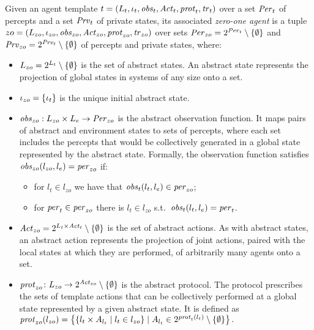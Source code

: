 \begin{definition}
Given an agent template ${t} = \left ( L_{t}, \iota_{t}, \mathit{obs}_{t},  \mathit{Act}_{t},
\mathit{prot}_{t}, \mathit{tr}_{t}  \right )$ over a set $\mathit{Per}_{t}$ of percepts and a set $\mathit{Prv}_{t}$ of
private states, its associated \emph{zero-one agent} is a tuple ${zo} =
\left ( L_{zo}, \iota_{zo}, \mathit{obs}_{zo}, \mathit{Act}_{zo}, \mathit{prot}_{zo}, \mathit{tr}_{zo} \right )$ over
sets $\mathit{Per}_{zo} = 2^{\mathit{Per}_{t}} \setminus \left \{ \emptyset \right \}$ and $\mathit{Prv}_{zo}=
2^{\mathit{Prv}_{t}} \setminus \left \{ \emptyset \right \}$ of percepts and private states, where:
\begin{itemize}[$\bullet$]\itemsep 0cm
    \item $L_{zo} = 2^{L_{t}} \setminus \left \{ \emptyset \right \}$ is the set
    of abstract states. An abstract state represents the projection of global
    states in systems of any size onto a set.

    \item $\iota_{zo} = \left \{ \iota_{t} \right \}$ is the unique initial abstract state.
    
    \item $\mathit{obs}_{zo} : L_{zo} \times L_{e} \rightarrow \mathit{Per}_{zo}$ is
    the abstract observation function. It maps pairs of abstract and environment
    states to sets of percepts, where each set includes the percepts that would
    be collectively generated in a global state represented by the abstract
    state. Formally, the observation function satisfies $\mathit{obs}_{zo}(l_{zo}, l_e) =
    \mathit{per}_{zo}$ if:
    \begin{itemize}[\textbf{--}]
    \item for $l_t \in l_{zo}$ we have that $\mathit{obs}_{t}(l_t, l_e) \in \mathit{per}_{zo}$;
      \item for $\mathit{per}_{t} \in \mathit{per}_{zo}$ there is $l_t \in l_{zo}$ s.t.\
        $\mathit{obs}_{t}(l_t, l_e) = \mathit{per}_{t}$.
    \end{itemize}

    \item $\mathit{Act}_{zo} = 2^{L_{t} \times \mathit{Act}_{t}} \setminus \left \{ \emptyset \right \}$
    is the set of abstract actions. As with abstract states, an abstract
    action represents the projection of joint actions, paired with the local
    states at which they are performed, of arbitrarily many agents onto a set.

    \item $\mathit{prot}_{zo} \colon L_{zo} \rightarrow 2^{\mathit{Act}_{zo}} \setminus
    \left \{ \emptyset \right \}$ is the abstract protocol. The protocol prescribes the sets
    of template actions that can be collectively performed at a global state
    represented by a given abstract state. It is defined as $\mathit{prot}_{zo}(l_{zo})
    = \left \{  \left \{ l_t \times A_{l_t} \mid l_t \in l_{zo} \right \} \mid A_{l_t} \in
    2^{\mathit{prot}_{t}(l_t)} \setminus \left \{ \emptyset \right \} \right \}.$


\end{itemize}
\end{definition}
